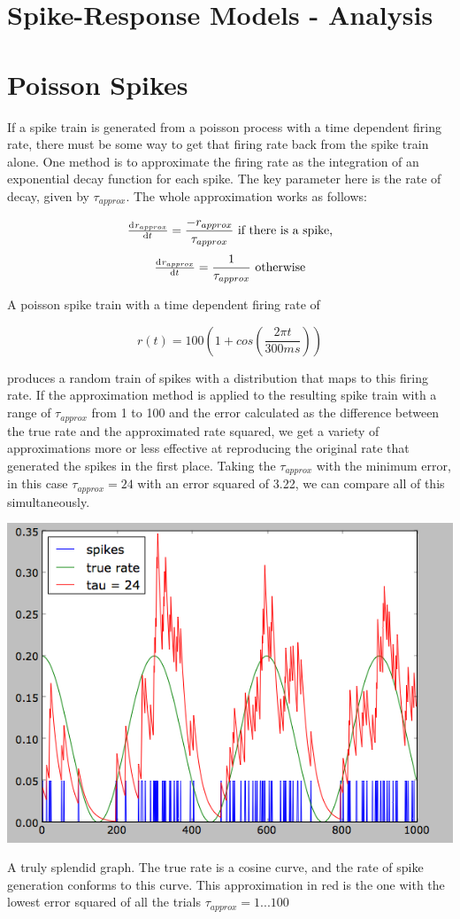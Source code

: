 \documentclass[12pt]{article}
\begin{document}
\section{Spike-Response Models - Analysis}



\section{Poisson Spikes}

If a spike train is generated from a poisson process with a time dependent firing rate, there must be some way to get that firing rate back from the spike train alone.  One method is to approximate the firing rate as the integration of an exponential decay function for each spike.  The key parameter here is the rate of decay, given by $\tau_{approx}$.  The whole approximation works as follows:

$$ \od{r_{approx}}{t}=\frac{-r_{approx}}{\tau_{approx}} \text{       if there is a spike,} $$
$$ \od{r_{approx}}{t}=\frac{1}{\tau_{approx}} \text{   otherwise} $$

A poisson spike train with a time dependent firing rate of 

$$ r(t)=100(1+cos(\frac{2\pi t}{300ms})) $$

produces a random train of spikes with a distribution that maps to this firing rate.  If the approximation method is applied to the resulting spike train with a range of $\tau_{approx}$ from 1 to 100 and the error calculated as the difference between the true rate and the approximated rate squared, we get a variety of approximations more or less effective at reproducing the original rate that generated the spikes in the first place.  Taking the $\tau_{approx}$ with the minimum error, in this case $\tau_{approx}=24$ with an error squared of 3.22, we can compare all of this simultaneously.

\vspace{15pt}
\includegraphics[scale=0.71]{poissonapprox.png}
\vspace{5pt}

A truly splendid graph.  The true rate is a cosine curve, and the rate of spike generation conforms to this curve.  This approximation in red is the one with the lowest error squared of all the trials $\tau_{approx}=1...100$
\end{document}
